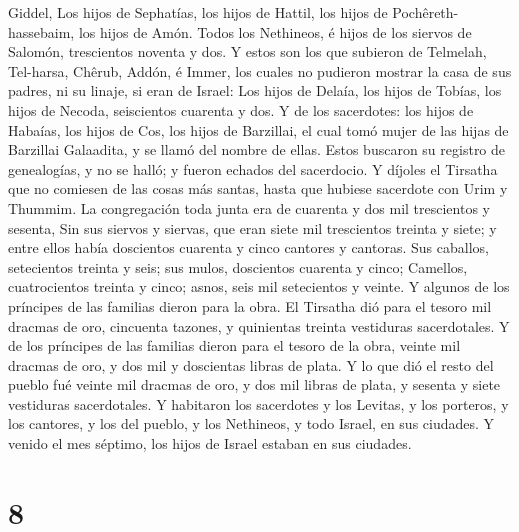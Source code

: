 Giddel,  Los hijos de Sephatías, los hijos de Hattil, los
hijos de Pochêreth-hassebaim, los hijos de Amón.  Todos
los Nethineos, é hijos de los siervos de Salomón, trescientos noventa y
dos.  Y estos son los que subieron de Telmelah,
Tel-harsa, Chêrub, Addón, é Immer, los cuales no pudieron mostrar la
casa de sus padres, ni su linaje, si eran de Israel:  Los
hijos de Delaía, los hijos de Tobías, los hijos de Necoda, seiscientos
cuarenta y dos.  Y de los sacerdotes: los hijos de
Habaías, los hijos de Cos, los hijos de Barzillai, el cual tomó mujer de
las hijas de Barzillai Galaadita, y se llamó del nombre de ellas.
 Estos buscaron su registro de genealogías, y no se
halló; y fueron echados del sacerdocio.  Y díjoles el
Tirsatha que no comiesen de las cosas más santas, hasta que hubiese
sacerdote con Urim y Thummim.  La congregación toda junta
era de cuarenta y dos mil trescientos y sesenta,  Sin sus
siervos y siervas, que eran siete mil trescientos treinta y siete; y
entre ellos había doscientos cuarenta y cinco cantores y cantoras.
 Sus caballos, setecientos treinta y seis; sus mulos,
doscientos cuarenta y cinco;  Camellos, cuatrocientos
treinta y cinco; asnos, seis mil setecientos y veinte.  Y
algunos de los príncipes de las familias dieron para la obra. El
Tirsatha dió para el tesoro mil dracmas de oro, cincuenta tazones, y
quinientas treinta vestiduras sacerdotales.  Y de los
príncipes de las familias dieron para el tesoro de la obra, veinte mil
dracmas de oro, y dos mil y doscientas libras de plata. 
Y lo que dió el resto del pueblo fué veinte mil dracmas de oro, y dos
mil libras de plata, y sesenta y siete vestiduras sacerdotales.
 Y habitaron los sacerdotes y los Levitas, y los
porteros, y los cantores, y los del pueblo, y los Nethineos, y todo
Israel, en sus ciudades. Y venido el mes séptimo, los hijos de Israel
estaban en sus ciudades.

\hypertarget{section-7}{%
\section{8}\label{section-7}}


